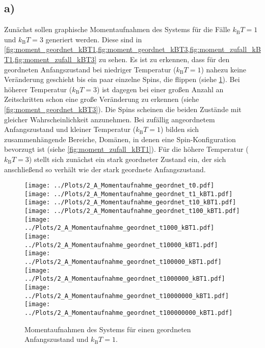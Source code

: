 \subsection*{a)}
Zunächst sollen graphische Momentaufnahmen des Systems für die Fälle $k_\text{B}T=1$ und $k_\text{B}T=3$ generiert werden.
Diese sind in \cref{fig:moment_geordnet_kBT1,fig:moment_geordnet_kBT3,fig:moment_zufall_kBT1,fig:moment_zufall_kBT3} zu sehen.
Es ist zu erkennen, dass für den geordneten Anfangszustand bei niedriger Temperatur ($k_\text{B}T=1$) nahezu keine Veränderung geschieht bis ein paar einzelne Spins, die flippen (siehe \cref{fig:moment_geordnet_kBT1}).
Bei höherer Temperatur ($k_\text{B}T=3$) ist dagegen bei einer großen Anzahl an Zeitschritten schon eine große Veränderung zu erkennen (siehe \cref{fig:moment_geordnet_kBT3}).
Die Spins scheinen die beiden Zustände mit gleicher Wahrscheinlichkeit anzunehmen.
Bei zufällig angeordnetem Anfangszustand und kleiner Temperatur ($k_\text{B}T=1$) bilden sich zusammenhängende Bereiche, Domänen, in denen eine Spin-Konfiguration bevorzugt ist (siehe \cref{fig:moment_zufall_kBT1}).
Für die höhere Temperatur ($k_\text{B}T=3$) stellt sich zunächst ein stark geordneter Zustand ein, der sich anschließend so verhält wie der stark geordnete Anfangszustand.
\begin{figure}
\centering
\texttt{[image: ../Plots/2\_A\_Momentaufnahme\_geordnet\_t0.pdf]}
\texttt{[image: ../Plots/2\_A\_Momentaufnahme\_geordnet\_t1\_kBT1.pdf]}
\texttt{[image: ../Plots/2\_A\_Momentaufnahme\_geordnet\_t10\_kBT1.pdf]}
\texttt{[image: ../Plots/2\_A\_Momentaufnahme\_geordnet\_t100\_kBT1.pdf]}
\texttt{[image: ../Plots/2\_A\_Momentaufnahme\_geordnet\_t1000\_kBT1.pdf]}
\texttt{[image: ../Plots/2\_A\_Momentaufnahme\_geordnet\_t10000\_kBT1.pdf]}
\texttt{[image: ../Plots/2\_A\_Momentaufnahme\_geordnet\_t100000\_kBT1.pdf]}
\texttt{[image: ../Plots/2\_A\_Momentaufnahme\_geordnet\_t1000000\_kBT1.pdf]}
\texttt{[image: ../Plots/2\_A\_Momentaufnahme\_geordnet\_t10000000\_kBT1.pdf]}
\texttt{[image: ../Plots/2\_A\_Momentaufnahme\_geordnet\_t100000000\_kBT1.pdf]}
\caption{Momentaufnahmen des Systems für einen geordneten Anfangszustand und $k_\text{B}T=1$.}
\label{fig:moment_geordnet_kBT1}
\end{figure}

